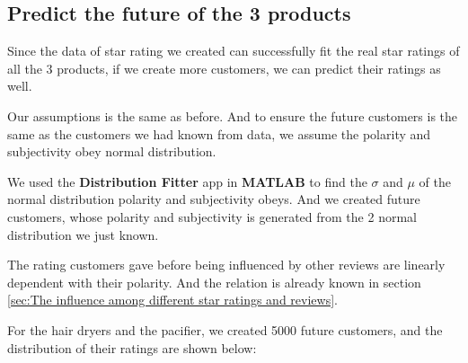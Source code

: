 \documentclass[12pt]{article}  %
\begin{document}
\subsection{Predict the future of the 3 products}

Since the data of star rating we created can successfully fit the real star ratings of all the 3 products, if we create more customers, we can predict their ratings as well.

Our assumptions is the same as before. And to ensure the future customers is the same as the customers we had known from data, we assume the polarity and subjectivity obey normal distribution.

We used the \textbf{Distribution Fitter} app in \textbf{MATLAB} to find the $\sigma$ and $\mu$ of the normal distribution polarity and subjectivity obeys. And we created future customers, whose polarity and subjectivity is generated from the 2 normal distribution we just known.

The rating customers gave before being influenced by other reviews are linearly dependent with their polarity. And the relation is already known in section \ref{sec:The influence among different star ratings and reviews}.

For the hair dryers and the pacifier, we created 5000 future customers, and the distribution of their ratings are shown below:
\end{document}

